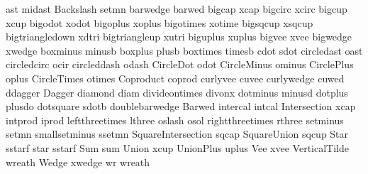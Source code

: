  ast                midast
 Backslash          setmn
 barwedge           barwed
 bigcap             xcap
 bigcirc            xcirc
 bigcup             xcup
 bigodot            xodot
 bigoplus           xoplus
 bigotimes          xotime
 bigsqcup           xsqcup
 bigtriangledown    xdtri
 bigtriangleup      xutri
 biguplus           xuplus
 bigvee             xvee
 bigwedge           xwedge
 boxminus           minusb
 boxplus            plusb
 boxtimes           timesb
 cdot               sdot
 circledast         oast
 circledcirc        ocir
 circleddash        odash
 CircleDot          odot
 CircleMinus        ominus
 CirclePlus         oplus
 CircleTimes        otimes
 Coproduct          coprod
 curlyvee           cuvee
 curlywedge         cuwed
 ddagger            Dagger
 diamond            diam
 divideontimes      divonx
 dotminus           minusd
 dotplus            plusdo
 dotsquare          sdotb
 doublebarwedge     Barwed
 intercal           intcal
 Intersection       xcap
 intprod            iprod
 leftthreetimes     lthree
 oslash             osol
 rightthreetimes    rthree
 setminus           setmn
 smallsetminus      ssetmn
 SquareIntersection sqcap
 SquareUnion        sqcup
 Star               sstarf
 star               sstarf
 Sum                sum
 Union              xcup
 UnionPlus          uplus
 Vee                xvee
 VerticalTilde      wreath
 Wedge              xwedge
 wr                 wreath
